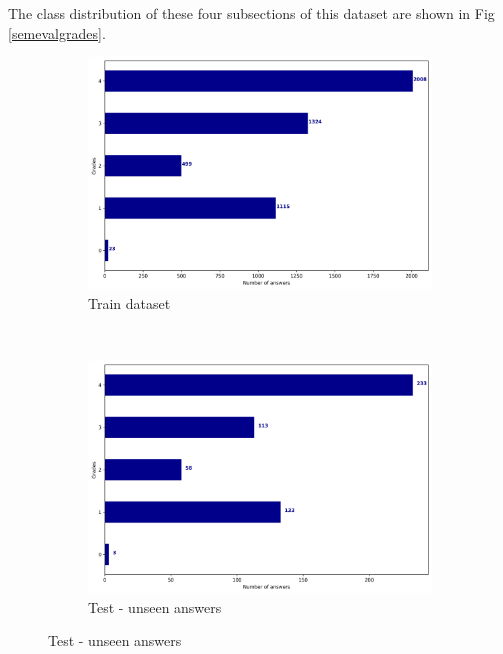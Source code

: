 	The class distribution of these four subsections of this dataset are shown in Fig \ref{semevalgrades}.
	
	
	
	\begin{figure}
		\centering
		\begin{subfigure}[b]{0.4\textwidth}
			\includegraphics[width=\textwidth]{images/semevalgrades}
			\caption{Train dataset}
		\end{subfigure}
		~
		\begin{subfigure}[b]{0.4\textwidth}
			\includegraphics[width=\textwidth]{images/semevalt1grades}
			\caption{Test - unseen answers}
		\end{subfigure}
		

\end{figure}

